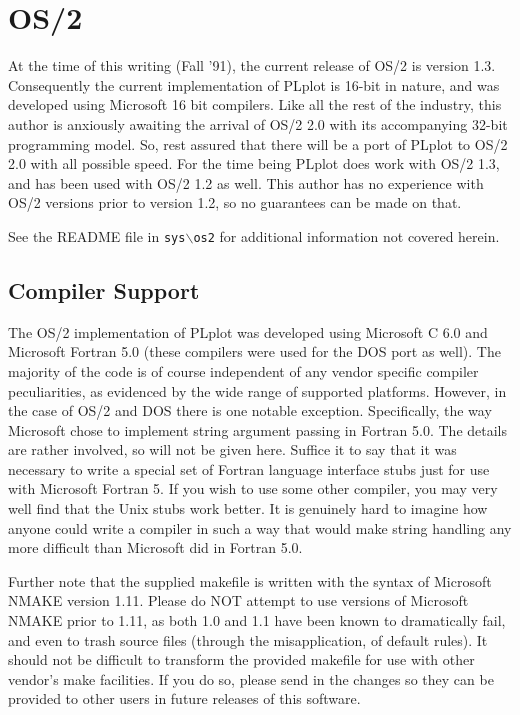 \section{OS/2}

At the time of this writing (Fall '91), the current release of OS/2 is version
1.3.  Consequently the current implementation of PLplot is 16-bit in nature,
and was developed using Microsoft 16 bit compilers.  Like all the rest of 
the industry, this author is anxiously awaiting the arrival of OS/2 2.0 with
its accompanying 32-bit programming model.  So, rest assured that there will
be a port of PLplot to OS/2 2.0 with all possible speed.  For the time being
PLplot does work with OS/2 1.3, and has been used with OS/2 1.2 as well.  
This author
has no experience with OS/2 versions prior to version 1.2, so no guarantees 
can be
made on that.

See the README file in {\tt sys$\backslash$os2} for additional 
information not covered herein.

\subsection{Compiler Support}

The OS/2 implementation of PLplot was developed using Microsoft C 6.0
and Microsoft Fortran 5.0 (these compilers were used for the DOS port
as well).  The majority of the code is of course independent of any
vendor specific compiler peculiarities, as evidenced by the wide range
of supported platforms.  However, in the case of OS/2 and DOS there is 
one notable exception.
Specifically, the way Microsoft chose to implement string argument 
passing in Fortran 5.0.  The details are rather involved, so will not
be given here.  Suffice it to say that it was necessary to write a 
special set of Fortran language interface stubs just for use with 
Microsoft Fortran 5.  If you wish to use some other compiler, you may
very well find that the Unix stubs work better.  It is genuinely hard
to imagine how anyone could write a compiler in such a way that would
make string handling any more difficult than Microsoft did in Fortran 5.0.

Further note that the supplied makefile is written with the syntax of
Microsoft NMAKE version 1.11.  Please do NOT attempt to use versions of
Microsoft NMAKE prior to 1.11, as both 1.0 and 1.1 have been known to
dramatically fail, and even to trash source files (through the misapplication,
of default rules).  It should not be
difficult to transform the provided makefile for use with other vendor's
make facilities.  If you do so, please send in the changes so they can
be provided to other users in future releases of this software.


